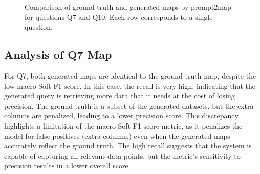 \begin{figure}[htbp]
    \centering

  
    \caption{Comparison of ground truth and generated maps by prompt2map for questions Q7 and Q10. Each row corresponds to a single question.}
    \label{fig:all_comparisons}
  \end{figure}

\subsection{Analysis of Q7 Map}

For Q7, both generated maps are identical to the ground truth map, despite the low macro Soft F1-score. In this case, the recall is very high, indicating that the generated query is retrieving more data that it needs at the cost of losing precision. The ground truth is a subset of the generated datasets, but the extra columns are penalized, leading to a lower precision score. This discrepancy highlights a limitation of the macro Soft F1-score metric, as it penalizes the model for false positives (extra columns) even when the generated maps accurately reflect the ground truth. The high recall suggests that the system is capable of capturing all relevant data points, but the metric's sensitivity to precision results in a lower overall score. 

